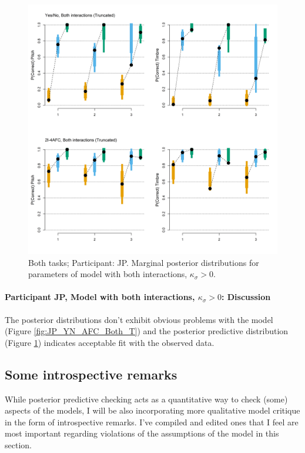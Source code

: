 \documentclass{article}\usepackage{knitr}
\begin{document}
\begin{figure}[H]
\centering
\includegraphics[scale=0.50, angle = 270]{Analysis_of_Human_Data/JP_post_pred_both_truncated}
\caption{Both tasks; Participant: JP. Marginal posterior distributions for parameters of model with both interactions, $\kappa_{\sigma} > 0$.}
\label{fig:JP_post_pred_both_truncated}
\end{figure}

\paragraph{Participant JP, Model with both interactions, $\kappa_{\sigma} > 0$: Discussion}

The posterior distributions don't exhibit obvious problems with the model (Figure \ref{fig:JP_YN_AFC_Both_T}) and the posterior predictive distribution (Figure \ref{fig:JP_post_pred_both_truncated}) indicates acceptable fit with the observed data.

\subsection{Some introspective remarks}
\label{sec:introspec}

While posterior predictive checking acts as a quantitative way to check (some) aspects of the models, I will be also incorporating more qualitative model critique in the form of introspective remarks. I've compiled and edited ones that I feel are most important regarding violations of the assumptions of the model in this section. 
\end{document}
